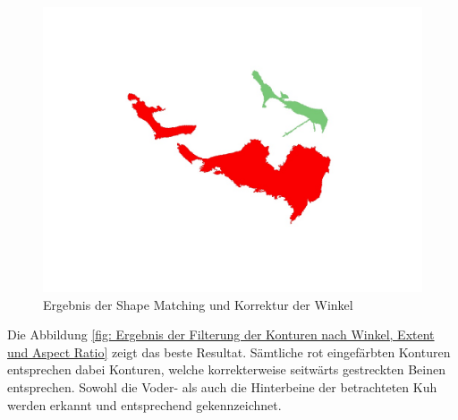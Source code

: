 \begin{figure}[H]
	\center
	\includegraphics[scale=0.43]{Grafiken/entwicklung/32BlankFilteredBySimilarity.jpg}
	\caption{Ergebnis der Shape Matching und Korrektur der Winkel} 
	\label{fig: Ergebnis der Shape Matching und Korrektur der Winkel} 
\end{figure}


Die Abbildung \ref{fig: Ergebnis der Filterung der Konturen nach Winkel, Extent und Aspect Ratio} zeigt das beste Resultat. Sämtliche rot eingefärbten Konturen entsprechen dabei Konturen, welche korrekterweise seitwärts gestreckten Beinen entsprechen. Sowohl die Voder- als auch die Hinterbeine der betrachteten Kuh werden erkannt und entsprechend gekennzeichnet.
